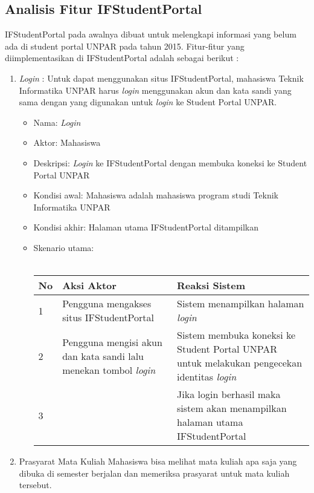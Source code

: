 \subsection{Analisis Fitur IFStudentPortal}
IFStudentPortal pada awalnya dibuat untuk melengkapi informasi yang belum ada di student portal UNPAR pada tahun 2015. Fitur-fitur yang diimplementasikan di IFStudentPortal adalah sebagai berikut : 
\begin{enumerate}
    \item \textit{Login} : 
    Untuk dapat menggunakan situs IFStudentPortal, mahasiswa Teknik Informatika UNPAR harus \textit{login} menggunakan akun dan kata sandi yang sama dengan yang digunakan untuk \textit{login} ke Student Portal UNPAR. 
    \begin{itemize}
			\item Nama: \textit{Login}
			\item Aktor: Mahasiswa
			\item Deskripsi: \textit{Login} ke IFStudentPortal dengan membuka koneksi ke Student Portal UNPAR
			\item Kondisi awal: Mahasiswa adalah mahasiswa program studi Teknik Informatika UNPAR
			\item Kondisi akhir: Halaman utama IFStudentPortal ditampilkan 
			\item Skenario utama: \\ \\
        \begin{tabular}{|p{0.5cm} |p{6cm}| p{6cm}|}
        \hline
            No & Aksi Aktor &  Reaksi Sistem \\ \hline     
            1 & Pengguna mengakses situs IFStudentPortal &  Sistem menampilkan halaman \textit{login}\\ \hline 
            2 & Pengguna mengisi akun dan kata sandi lalu menekan tombol \textit{login} & Sistem membuka koneksi ke Student Portal UNPAR untuk melakukan pengecekan identitas \textit{login} \\ \hline 
            3 & & Jika login berhasil maka sistem akan menampilkan halaman utama IFStudentPortal\\ \hline 
        \end{tabular}
    \end{itemize}
    \item Prasyarat Mata Kuliah
    Mahasiswa bisa melihat mata kuliah apa saja yang dibuka di semester berjalan dan memeriksa prasyarat untuk mata kuliah tersebut. 
    \begin{itemize}

\end{itemize}
\end{enumerate}
